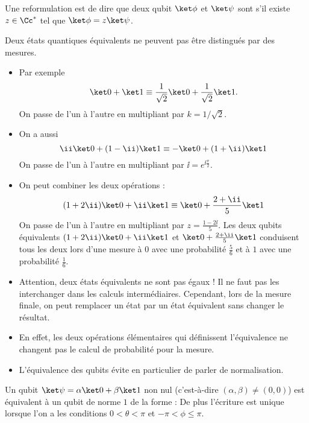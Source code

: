 \documentclass[11pt,class=report,crop=false]{standalone}
\begin{document}
Une reformulation est de dire que deux qubit $\ket\phi$ et $\ket\psi$ sont  s'il existe $z\in\Cc^*$ tel que $\ket\phi = z \ket\psi$.

Deux états quantiques équivalents ne peuvent pas être distingués par des mesures.

\begin{exemple}
\sauteligne
\begin{itemize}
  \item Par exemple 
$$\ket0 + \ket1 \equiv \frac{1}{\sqrt2}\ket0+\frac{1}{\sqrt2}\ket1.$$
On passe de l'un à l'autre en multipliant par $k=1/\sqrt2$.

  \item On a aussi
$$\ii\ket0 + (1-\ii) \ket1 \equiv -\ket 0 + (1+\ii)\ket1$$
On passe de l'un à l'autre en multipliant par $\ii = e^{\ii \frac\pi2}$.
 
  \item On peut combiner les deux opérations :
$$(1+2\ii)\ket0 + \ii \ket1 \equiv \ket 0 + \frac{2+\ii}{5}\ket1$$
On passe de l'un à l'autre en multipliant par $z=\frac{1-2\ii}{5}$.
Les deux qubits équivalents $(1+2\ii)\ket0 + \ii \ket1$ et $\ket 0 + \frac{2+\ii}{5}\ket1$ conduisent tous les deux lors d'une mesure à $0$ avec une probabilité $\frac{5}{6}$ et à $1$ avec une probabilité $\frac{1}{6}$.
\end{itemize}
\end{exemple}


\begin{remarque*}
\sauteligne
\begin{itemize}
  \item Attention, deux états équivalents ne sont pas égaux ! Il ne faut pas les interchanger dans les calculs intermédiaires. Cependant, lors de la mesure finale, on peut remplacer un état par un état équivalent sans changer le résultat. 
  \item En effet, les deux opérations élémentaires qui définissent l'équivalence ne changent pas le calcul de probabilité pour la mesure.
  \item L'équivalence des qubits évite en particulier de parler de normalisation.
\end{itemize}
\end{remarque*}


\begin{proposition}
\label{prop:dimdeux}
Un qubit $\ket\psi = \alpha\ket0+\beta\ket1$ non nul (c'est-à-dire $(\alpha,\beta)\neq(0,0)$) est équivalent à un qubit de norme $1$ de la forme :
De plus l'écriture est unique lorsque l'on a les conditions $0<\theta<\pi$ et $-\pi < \phi \le \pi$.
\end{proposition}
\end{document}
